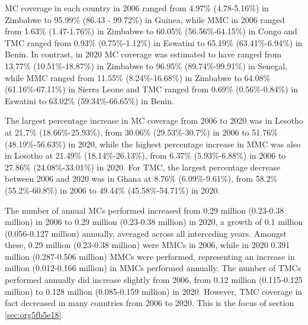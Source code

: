 \documentclass{article}
\begin{document}
MC coverage in each country in 2006 ranged from 4.97\% (4.78-5.16\%) in Zimbabwe to 95.99\% (86.43 - 99.72\%) in Guinea, while MMC in 2006 ranged from 1.63\% (1.47-1.76\%) in Zimbabwe to 60.05\% (56.56\%-64.15\%) in Congo and TMC ranged from 0.93\% (0.75\%-1.12\%) in Eswatini to 65.19\% (63.41\%-6.94\%)
in Benin. In contrast, in 2020 MC coverage was estimated to have ranged from 13.77\% (10.51\%-18.87\%) in
Zimbabwe to 96.95\% (89.74\%-99.91\%) in Senegal, while MMC ranged from 11.55\% (8.24\%-16.68\%) in
Zimbabwe to 64.08\% (61.16\%-67.11\%) in Sierra Leone and TMC ranged from 0.69\% (0.56\%-0.84\%) in
Eswatini to 63.02\% (59.34\%-66.65\%) in Benin.

The largest percentage increase in MC coverage from 2006 to 2020 was in Lesotho at 21.7\% (18.66\%-25.93\%),
from 30.06\% (29.53\%-30.7\%) in 2006 to 51.76\% (48.19\%-56.63\%) in 2020, while the highest percentage
increase in MMC was also in Lesotho at 21.49\% (18.14\%-26.13\%), from 6.37\% (5.93\%-6.88\%) in 2006 to
27.86\% (24.08\%-33.01\%) in 2020. For TMC, the largest percentage decrease between 2006 and 2020 was in
Ghana at 8.76\% (6.09\%-9.61\%), from 58.2\% (55.2\%-60.8\%) in 2006 to 49.44\% (45.58\%-54.71\%) in 2020.

The number of annual MCs performed increased from 0.29 million (0.23-0.38 million) in 2006 to 0.29 million
(0.23-0.38 million) in 2020, a growth of 0.1 million (0.056-0.127 million) annually, averaged across all
interceding years. Amongst these, 0.29 million (0.23-0.38 million) were MMCs in 2006, while in 2020 0.391
million (0.287-0.506 million) MMCs were performed, representing an increase in million (0.012-0.166
million) in MMCs performed annually. The number of TMCs performed annually did increase slightly from
2006, from 0.12 million (0.115-0.125 million) to 0.128 million (0.085-0.159 million) in 2020. However,
TMC coverage in fact decreased in many countries from 2006 to 2020. This is the focus of section \ref{sec:org5fb5e18}.
\end{document}
